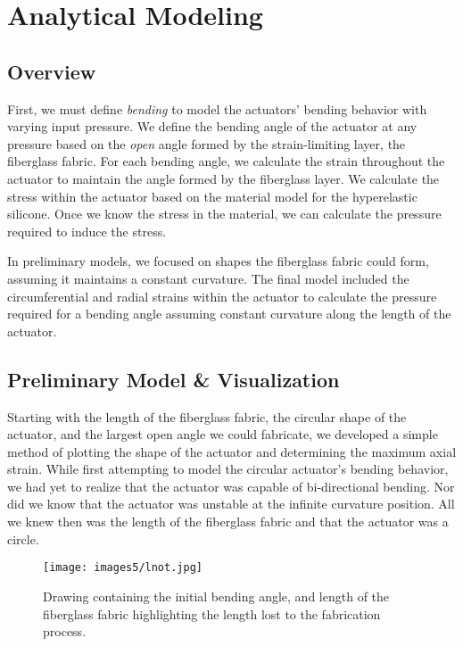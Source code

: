 \chapter{Analytical Modeling}
\label{chapter:model}

\section{Overview}
First, we must define \emph{bending} to model the actuators' bending behavior with varying input pressure. We define the bending angle of the actuator at any pressure based on the \emph{open} angle formed by the strain-limiting layer, the fiberglass fabric. For each bending angle, we calculate the strain throughout the actuator to maintain the angle formed by the fiberglass layer. We calculate the stress within the actuator based on the material model for the hyperelastic silicone. Once we know the stress in the material, we can calculate the pressure required to induce the stress. 

In preliminary models, we focused on shapes the fiberglass fabric could form, assuming it maintains a constant curvature. The final model included the circumferential and radial strains within the actuator to calculate the pressure required for a bending angle assuming constant curvature along the length of the actuator. 

\section{Preliminary Model \& Visualization}

Starting with the length of the fiberglass fabric, the circular shape of the actuator, and the largest open angle we could fabricate, we developed a simple method of plotting the shape of the actuator and determining the maximum axial strain. While first attempting to model the circular actuator's bending behavior, we had yet to realize that the actuator was capable of bi-directional bending. Nor did we know that the actuator was unstable at the infinite curvature position. All we knew then was the length of the fiberglass fabric and that the actuator was a circle. 

\begin{figure}[ht]
    \centering
    \texttt{[image: images5/lnot.jpg]}
    \caption{Drawing containing the initial bending angle, and length of the fiberglass fabric highlighting the length lost to the fabrication process.}
    \label{fig:lnot}
\end{figure}

